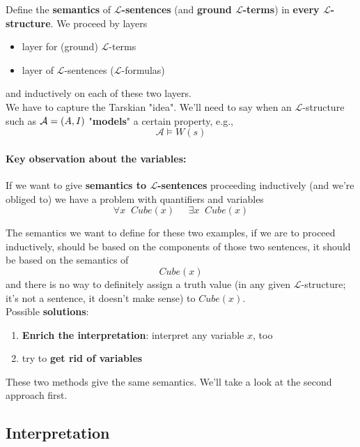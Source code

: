 Define the \textbf{semantics} of \textbf{$\mathcal{L}$-sentences} (and \textbf{ground $\mathcal{L}$-terms}) in \textbf{every $\mathcal{L}$-structure}. We proceed by layers
\begin{itemize}
	\item layer for (ground) $\mathcal{L}$-terms
	\item layer of $\mathcal{L}$-sentences ($\mathcal{L}$-formulas)
\end{itemize}
and inductively on each of these two layers.\\

We have to capture the Tarskian "idea". We'll need to say when an $\mathcal{L}$-structure such as $\mathcal{A} = (A,I)$ "\textbf{models}" a certain property, e.g., 
$$ \mathcal{A} \models W(s)$$


\paragraph{Key observation about the variables:} If we want to give \textbf{semantics to $\mathcal{L}$-sentences} proceeding inductively (and we're obliged to) we have a problem with quantifiers and variables
$$ \forall x \;\; Cube(x) \;\;\;\;\; \exists x \;\; Cube(x) $$

The semantics we want to define for these two examples, if we are to proceed inductively, should be based on the components of those two sentences, it should be based on the semantics of 
$$ Cube(x) $$
and there is no way to definitely assign a truth value (in any given $\mathcal{L}$-structure; it's not a sentence, it doesn't make sense) to $Cube(x)$.\\

Possible \textbf{solutions}: 
\begin{enumerate}
	\item \textbf{Enrich the interpretation}: interpret any variable $x$, too
	\item try to \textbf{get rid of variables} %
\end{enumerate}

These two methods give the same semantics. We'll take a look at the second approach first.\\

\newpage

\subsection{Interpretation}

